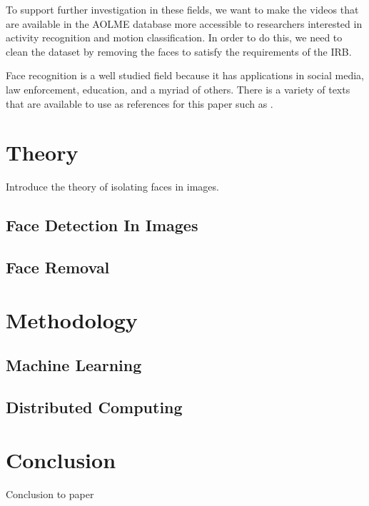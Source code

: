 \documentclass[
	submission,
	final,
	notitlepage,
	narroweqnarray,
	inline,
	twoside,
	]{ieee}
\begin{document}
To support further investigation in these fields, we want to make the videos that are available
in the AOLME database more accessible to researchers interested in 
activity recognition and motion classification. In order to do this, 
we need to clean the dataset by removing the faces to satisfy the requirements
of the IRB.

Face recognition is a well studied field because it has applications in 
social media, law enforcement, education, and a myriad of others. There is a 
variety of texts that are available to use as references for this paper such
as \cite{face_recog_book} \cite{kernel_learning} \cite{machine_face_recog}.

\section{Theory}
\PARstart Introduce the theory of isolating faces in images.
\subsection{Face Detection In Images}
\subsection{Face Removal}


\section{Methodology} 
\subsection{Machine Learning} 
\subsection{Distributed Computing}

\section{Conclusion}
\PARstart Conclusion to paper



\end{document}
